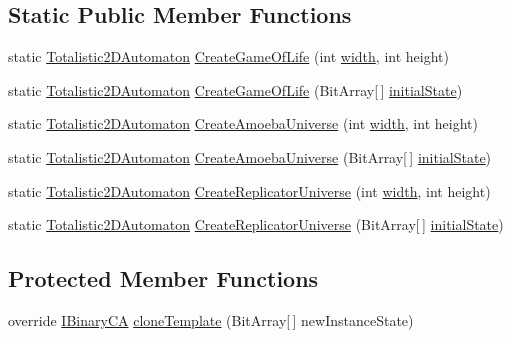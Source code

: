 \subsection*{Static Public Member Functions}
\begin{DoxyCompactItemize}
\item 
static \hyperlink{class_cellular_1_1_totalistic2_d_automaton}{Totalistic2\+D\+Automaton} \hyperlink{class_cellular_1_1_totalistic2_d_automaton_a76eeb87d529b320437eebbf664acf013}{Create\+Game\+Of\+Life} (int \hyperlink{class_cellular_1_1_automaton2_d_a1e9e5ec637c747a859c346839c90d174}{width}, int height)
\item 
static \hyperlink{class_cellular_1_1_totalistic2_d_automaton}{Totalistic2\+D\+Automaton} \hyperlink{class_cellular_1_1_totalistic2_d_automaton_aa8227b8be752f1c0e19f5cc6d605a011}{Create\+Game\+Of\+Life} (Bit\+Array\mbox{[}$\,$\mbox{]} \hyperlink{all__1_8js_ae8b87ff4be2ae1dd5267342795263360}{initial\+State})
\item 
static \hyperlink{class_cellular_1_1_totalistic2_d_automaton}{Totalistic2\+D\+Automaton} \hyperlink{class_cellular_1_1_totalistic2_d_automaton_a79ed2d655e37829d26a9eed7974e726f}{Create\+Amoeba\+Universe} (int \hyperlink{class_cellular_1_1_automaton2_d_a1e9e5ec637c747a859c346839c90d174}{width}, int height)
\item 
static \hyperlink{class_cellular_1_1_totalistic2_d_automaton}{Totalistic2\+D\+Automaton} \hyperlink{class_cellular_1_1_totalistic2_d_automaton_a34a59a60c4a12e0b7904b37666385512}{Create\+Amoeba\+Universe} (Bit\+Array\mbox{[}$\,$\mbox{]} \hyperlink{all__1_8js_ae8b87ff4be2ae1dd5267342795263360}{initial\+State})
\item 
static \hyperlink{class_cellular_1_1_totalistic2_d_automaton}{Totalistic2\+D\+Automaton} \hyperlink{class_cellular_1_1_totalistic2_d_automaton_a9f5a2308bc2b17ee7a9c779608e505ba}{Create\+Replicator\+Universe} (int \hyperlink{class_cellular_1_1_automaton2_d_a1e9e5ec637c747a859c346839c90d174}{width}, int height)
\item 
static \hyperlink{class_cellular_1_1_totalistic2_d_automaton}{Totalistic2\+D\+Automaton} \hyperlink{class_cellular_1_1_totalistic2_d_automaton_a0d8bbe04fcb603d8ff614864e39c386d}{Create\+Replicator\+Universe} (Bit\+Array\mbox{[}$\,$\mbox{]} \hyperlink{all__1_8js_ae8b87ff4be2ae1dd5267342795263360}{initial\+State})
\end{DoxyCompactItemize}
\subsection*{Protected Member Functions}
\begin{DoxyCompactItemize}
\item 
override \hyperlink{interface_cellular_1_1_i_binary_c_a}{I\+Binary\+C\+A} \hyperlink{class_cellular_1_1_totalistic2_d_automaton_ad5cc3f46a556aa1b1c99bdfa92f5ba1d}{clone\+Template} (Bit\+Array\mbox{[}$\,$\mbox{]} new\+Instance\+State)
\end{DoxyCompactItemize}
